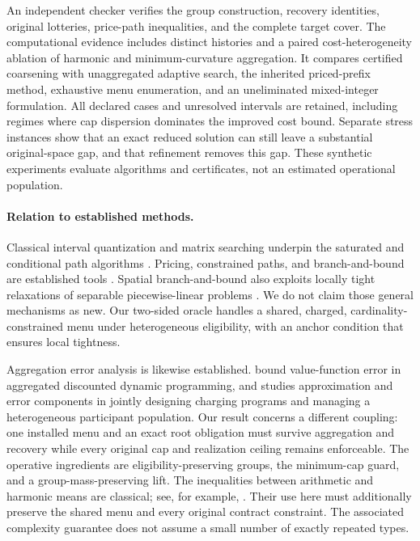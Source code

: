 An independent checker verifies the group construction, recovery identities, original lotteries, price-path inequalities, and the complete target cover. The computational evidence includes distinct histories and a paired cost-heterogeneity ablation of harmonic and minimum-curvature aggregation. It compares certified coarsening with unaggregated adaptive search, the inherited priced-prefix method, exhaustive menu enumeration, and an uneliminated mixed-integer formulation. All declared cases and unresolved intervals are retained, including regimes where cap dispersion dominates the improved cost bound. Separate stress instances show that an exact reduced solution can still leave a substantial original-space gap, and that refinement removes this gap. These synthetic experiments evaluate algorithms and certificates, not an estimated operational population.

\paragraph{Relation to established methods.}\label{sec:r37-position}
Classical interval quantization and matrix searching underpin the saturated and conditional path algorithms \citep{Wu1991,NielsenNock2014,GronlundEtAl2017}. Pricing, constrained paths, and branch-and-bound are established tools \citep{HandlerZang1980,LawlerWood1966,Lemarechal2001}. Spatial branch-and-bound also exploits locally tight relaxations of separable piecewise-linear problems \citep{HubnerEtAl2025}. We do not claim those general mechanisms as new. Our two-sided oracle handles a shared, charged, cardinality-constrained menu under heterogeneous eligibility, with an anchor condition that ensures local tightness.

Aggregation error analysis is likewise established. \citet{LiBertsekas2025} bound value-function error in aggregated discounted dynamic programming, and \citet{Fattahi2025} studies approximation and error components in jointly designing charging programs and managing a heterogeneous participant population. Our result concerns a different coupling: one installed menu and an exact root obligation must survive aggregation and recovery while every original cap and realization ceiling remains enforceable. The operative ingredients are eligibility-preserving groups, the minimum-cap guard, and a group-mass-preserving lift. The inequalities between arithmetic and harmonic means are classical; see, for example, \citet{LiaoWu2015}. Their use here must additionally preserve the shared menu and every original contract constraint. The associated complexity guarantee does not assume a small number of exactly repeated types.

